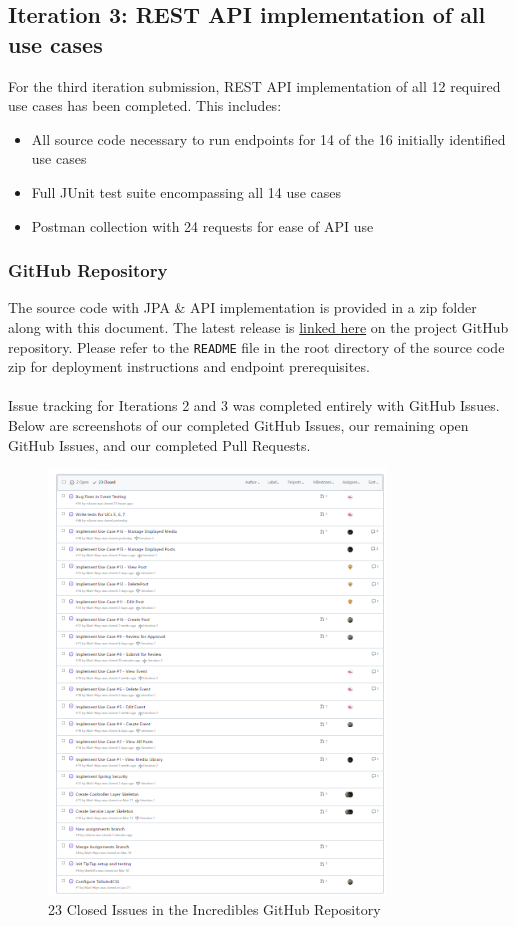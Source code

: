 \subsection{Iteration 3: REST API implementation of all use cases}
For the third iteration submission, REST API implementation of all 12 required use cases has been completed. This includes:
\begin{itemize}
    \item All source code necessary to run endpoints for 14 of the 16 initially identified use cases
    \item Full JUnit test suite encompassing all 14 use cases
    \item Postman collection with 24 requests for ease of API use
\end{itemize}

\subsubsection{GitHub Repository}

The source code with JPA \& API implementation is provided in a zip folder along with this document. The latest release is \href{https://github.com/tkm3d1a/cs5324_s24_class_project/releases/tag/0.1}{linked here} on the project GitHub repository. Please refer to the \texttt{README} file in the root directory of the source code zip for deployment instructions and endpoint prerequisites. \\
\\
Issue tracking for Iterations 2 and 3 was completed entirely with GitHub Issues. Below are screenshots of our completed GitHub Issues, our remaining open GitHub Issues, and our completed Pull Requests.

\begin{figure}[H]
    \centering
    \includegraphics[width=0.8\textwidth]{images/ClosedIssues.png}
    \centering
    \caption{23 Closed Issues in the Incredibles GitHub Repository}
\end{figure}

